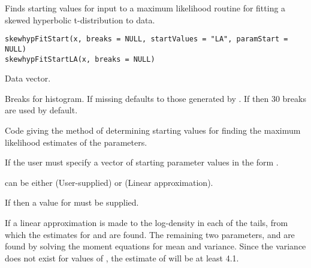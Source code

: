 \begin{Description}\relax
Finds starting values for input to a maximum likelihood routine for
fitting a skewed hyperbolic t-distribution to data.
\end{Description}
\begin{Usage}
\begin{verbatim}
skewhypFitStart(x, breaks = NULL, startValues = "LA", paramStart = NULL)
skewhypFitStartLA(x, breaks = NULL)
\end{verbatim}
\end{Usage}
\begin{Arguments}
\begin{ldescription}
\item[\code{x}] Data vector.
\item[\code{breaks}] Breaks for histogram. If missing defaults to those
generated by . If
 then 30 breaks are used by default.
\item[\code{startValues}] Code giving the method of determining starting
values for finding the maximum likelihood estimates of the
parameters.
\item[\code{paramStart}] If  the user must specify a
vector of starting parameter values in the form .
\end{ldescription}
\end{Arguments}
\begin{Details}\relax
{} can be either (User-supplied) or
 (Linear approximation).

If  then a value for  must be
supplied.

If  a linear approximation is made to the
log-density in each of the tails, from which the estimates for
 and  are found. The remaining two
parameters,  and  are found by solving
the moment equations for mean and variance.
Since the variance does not exist for values of , the estimate of  will be at least 4.1.
\end{Details}
